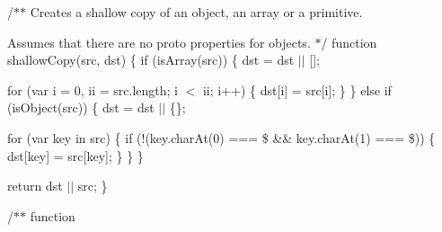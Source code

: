 /$\ast$$\ast$ Creates a shallow copy of an object, an array or a primitive.

Assumes that there are no proto properties for objects. $\ast$/ function shallow\+Copy(src, dst) \{ if (is\+Array(src)) \{ dst = dst $\vert$$\vert$ \mbox{[}\mbox{]};

for (var i = 0, ii = src.\+length; i $<$ ii; i++) \{ dst\mbox{[}i\mbox{]} = src\mbox{[}i\mbox{]}; \} \} else if (is\+Object(src)) \{ dst = dst $\vert$$\vert$ \{\};

for (var key in src) \{ if (!(key.\+char\+At(0) === \textquotesingle{}\$\textquotesingle{} \&\& key.\+char\+At(1) === \textquotesingle{}\$\textquotesingle{})) \{ dst\mbox{[}key\mbox{]} = src\mbox{[}key\mbox{]}; \} \} \}

return dst $\vert$$\vert$ src; \}

/$\ast$$\ast$  function



